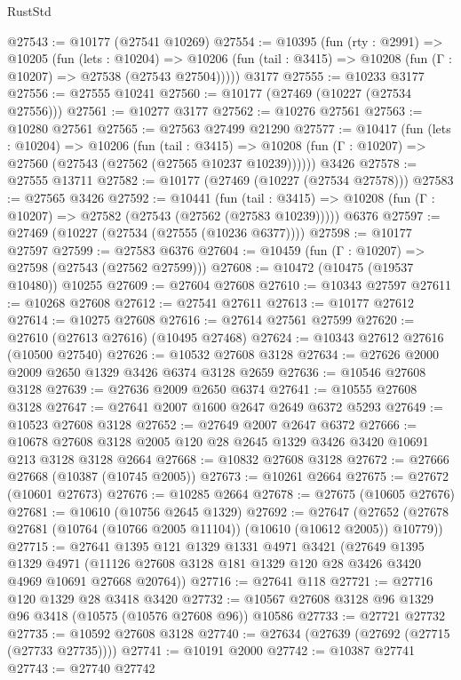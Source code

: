 \begin{lexlean}{RustStd}
\begin{coremodule}
@27543 := @10177 (@27541 @10269)
@27554 := @10395
    (fun (rty : @2991) =>
    @10205
      (fun (lets : @10204) =>
      @10206 (fun (tail : @3415) => @10208 (fun (Γ : @10207) => @27538 (@27543 @27504)))))
    @3177
@27555 := @10233 @3177
@27556 := @27555 @10241
@27560 := @10177 (@27469 (@10227 (@27534 @27556)))
@27561 := @10277 @3177
@27562 := @10276 @27561
@27563 := @10280 @27561
@27565 := @27563 @27499 @21290
@27577 := @10417
    (fun (lets : @10204) =>
    @10206
      (fun (tail : @3415) =>
      @10208 (fun (Γ : @10207) => @27560 (@27543 (@27562 (@27565 @10237 @10239))))))
    @3426
@27578 := @27555 @13711
@27582 := @10177 (@27469 (@10227 (@27534 @27578)))
@27583 := @27565 @3426
@27592 := @10441
    (fun (tail : @3415) => @10208 (fun (Γ : @10207) => @27582 (@27543 (@27562 (@27583 @10239)))))
    @6376
@27597 := @27469 (@10227 (@27534 (@27555 (@10236 @6377))))
@27598 := @10177 @27597
@27599 := @27583 @6376
@27604 := @10459 (fun (Γ : @10207) => @27598 (@27543 (@27562 @27599)))
@27608 := @10472 (@10475 (@19537 @10480)) @10255
@27609 := @27604 @27608
@27610 := @10343 @27597
@27611 := @10268 @27608
@27612 := @27541 @27611
@27613 := @10177 @27612
@27614 := @10275 @27608
@27616 := @27614 @27561 @27599
@27620 := @27610 (@27613 @27616) (@10495 @27468)
@27624 := @10343 @27612 @27616 (@10500 @27540)
@27626 := @10532 @27608 @3128
@27634 := @27626 @2000 @2009 @2650 @1329 @3426 @6374 @3128 @2659
@27636 := @10546 @27608 @3128
@27639 := @27636 @2009 @2650 @6374
@27641 := @10555 @27608 @3128
@27647 := @27641 @2007 @1600 @2647 @2649 @6372 @5293
@27649 := @10523 @27608 @3128
@27652 := @27649 @2007 @2647 @6372
@27666 := @10678 @27608 @3128 @2005 @120 @28 @2645 @1329 @3426 @3420 @10691 @213 @3128 @3128 @2664
@27668 := @10832 @27608 @3128
@27672 := @27666 @27668 (@10387 (@10745 @2005))
@27673 := @10261 @2664
@27675 := @27672 (@10601 @27673)
@27676 := @10285 @2664
@27678 := @27675 (@10605 @27676)
@27681 := @10610 (@10756 @2645 @1329)
@27692 := @27647
    (@27652 (@27678 @27681 (@10764 (@10766 @2005 @11104)) (@10610 (@10612 @2005)) @10779))
@27715 := @27641
    @1395
    @121
    @1329
    @1331
    @4971
    @3421
    (@27649
      @1395
      @1329
      @4971
      (@11126 @27608 @3128 @181 @1329 @120 @28 @3426 @3420 @4969 @10691 @27668 @20764))
@27716 := @27641 @118
@27721 := @27716 @120 @1329 @28 @3418 @3420
@27732 := @10567 @27608 @3128 @96 @1329 @96 @3418 (@10575 (@10576 @27608 @96)) @10586
@27733 := @27721 @27732
@27735 := @10592 @27608 @3128
@27740 := @27634 (@27639 (@27692 (@27715 (@27733 @27735))))
@27741 := @10191 @2000
@27742 := @10387 @27741
@27743 := @27740 @27742

\end{coremodule}
\end{lexlean}
